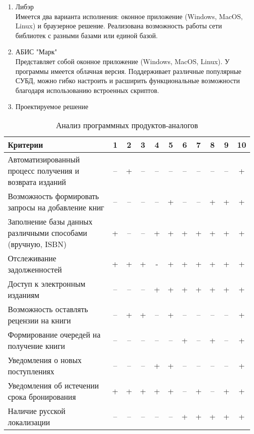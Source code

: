 \documentclass[./intro.tex]{subfiles}
\begin{document}
\begin{enumerate}
    \item Либэр \cite{Liber} \\
    Имеется два варианта исполнения: оконное приложение (Windows, MacOS, Linux) и браузерное решение. Реализована возможность работы сети библиотек с разными базами или единой базой.
    \item АБИС "Марк" \cite{ABISmark} \\
    Представляет собой оконное приложение (Windows, MacOS, Linux). У программы имеется облачная версия. Поддерживает различные популярные СУБД, можно гибко настроить и расширить функциональные возможности благодаря использованию встроенных скриптов.
    \item Проектируемое решение
\end{enumerate}

\begin{table}[h]
    \caption{Анализ программных продуктов-аналогов}
    \label{table:1}
    \begin{tabular}{|p{8.5cm}|c|c|c|c|c|c|c|c|c|c|}
        \hline
        Критерии & 1 & 2 & 3 & 4 & 5 & 6 & 7 & 8 & 9 & 10\\
        \hline
        Автоматизированный процесс получения и возврата изданий & – & + & – & – & – & – & – & – & – & + \\
        \hline
        Возможность формировать запросы на добавление книг & – & – & – & – & + & – & – & + & + & + \\
        \hline
        Заполнение базы данных различными способами (вручную, ISBN) & + & – & – & + & + & + & + & + & + & + \\
        \hline
        Отслеживание задолженностей & + & + & + & - & + & + & + & + & + & + \\
        \hline
        Доступ к электронным изданиям & – & – & – & + & + & + & + & + & + & + \\
        \hline
        Возможность оставлять рецензии на книги & – & + & + & – & + & – & – & – & – & + \\
        \hline
        Формирование очередей на получение книги & – & – & – & – & – & + & – & + & – & + \\
        \hline
        Уведомления о новых поступлениях & – & – & – & + & + & – & – & – & – & + \\
        \hline
        Уведомления об истечении срока бронирования & + & + & + & + & + & – & + & – & + & + \\
        \hline
        Наличие русской локализации & – & – & – & – & – & + & + & + & + & + \\
        \hline
    \end{tabular}    
\end{table}
\end{document}
